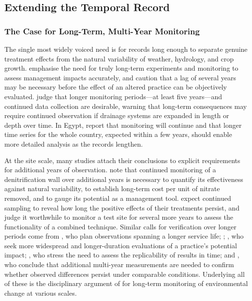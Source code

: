 \documentclass[11pt]{article}
\begin{document}
\subsection{Extending the Temporal Record}

\subsubsection{The Case for Long-Term, Multi-Year Monitoring}

The single most widely voiced need is for records long enough to separate genuine treatment effects from the natural variability of weather, hydrology, and crop growth. \textcite{Clifford2023} emphasise the need for truly long-term experiments and monitoring to assess management impacts accurately, and \textcite{BUHLER1993} caution that a lag of several years may be necessary before the effect of an altered practice can be objectively evaluated. \textcite{Ali2013} judge that longer monitoring periods---at least five years---and continued data collection are desirable, warning that long-term consequences may require continued observation if drainage systems are expanded in length or depth over time. In Egypt, \textcite{Ali2001} report that monitoring will continue and that longer time series for the whole country, expected within a few years, should enable more detailed analysis as the records lengthen.

At the site scale, many studies attach their conclusions to explicit requirements for additional years of observation. \textcite{Jaynes2008} note that continued monitoring of a denitrification wall over additional years is necessary to quantify its effectiveness against natural variability, to establish long-term cost per unit of nitrate removed, and to gauge its potential as a management tool. \textcite{Dalhem2019} expect continued sampling to reveal how long the positive effects of their treatments persist, and \textcite{Osterholm2005} judge it worthwhile to monitor a test site for several more years to assess the functionality of a combined technique. Similar calls for verification over longer periods come from \textcite{ROLLIN1987}, who plan observations spanning a longer service life; \textcite{Wesström2015}; \textcite{Reinhart2020}, who seek more widespread and longer-duration evaluations of a practice's potential impact; \textcite{Rijal2012}, who stress the need to assess the replicability of results in time; and \textcite{GiménezValero2025}, who conclude that additional multi-year measurements are needed to confirm whether observed differences persist under comparable conditions. Underlying all of these is the disciplinary argument of \textcite{SPALING1995} for long-term monitoring of environmental change at various scales.
\end{document}
